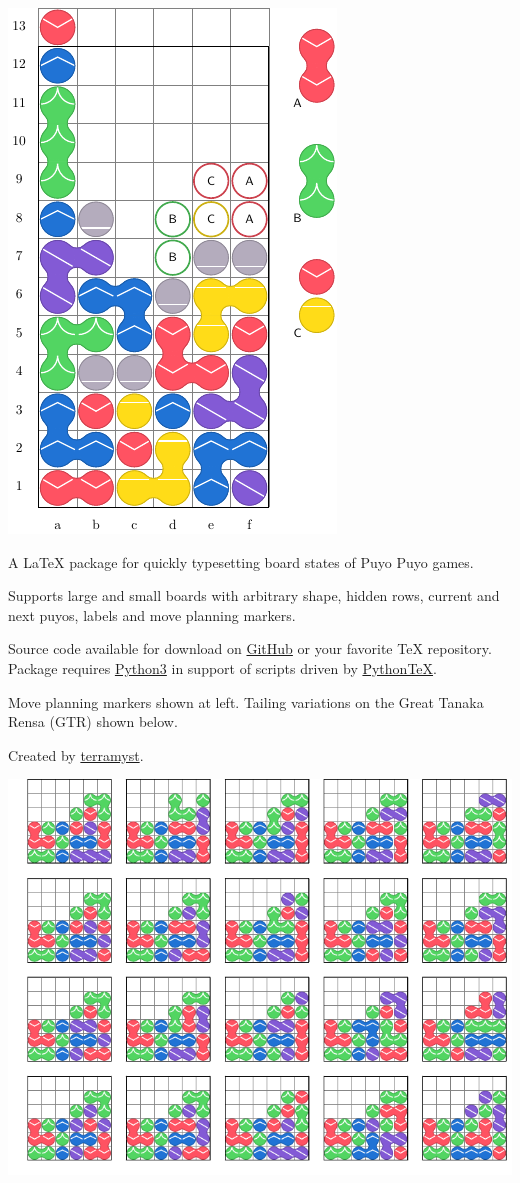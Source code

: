 \documentclass{article}
\makeatletter
\newcommand{\latex}{\LaTeX\xspace}
\newcommand{\tex}{\TeX\xspace}
\newcommand{\parline}{\vspace{\baselineskip}}
\newcommand{\parlineskip}{\par \parline}
\newcommand{\link}[2]{\href{#1}{\color{darkbluepuyo}#2}}
\newcommand{\github}{\link{https://github.com/amosborne/puyotex}{GitHub}\xspace}
\newcommand{\python}{\link{https://www.python.org/download/releases/3.0/}{Python3}\xspace}
\newcommand{\pythontex}{\link{https://ctan.org/pkg/pythontex?lang=en}{Python\tex}\xspace}
\newenvironment{halfpage}[1][]
	{\noindent\begin{minipage}{0.5\textwidth}\@ifmtarg{#1}{}{\begin{center}\Huge#1\end{center}}}
	{\end{minipage}}
\makeatother
\begin{document}
\begin{halfpage}
	\includegraphics{subfigures/cover_big_board.pdf}
\end{halfpage}%
\begin{halfpage}[Puyo\tex]
	A \latex package for quickly typesetting board states of Puyo Puyo games.\parlineskip
	Supports large and small boards with arbitrary shape, hidden rows, current and next puyos, labels and move planning markers.\parlineskip
	Source code available for download on \github or your favorite \tex repository. Package requires \python in support of scripts driven by \pythontex.\parlineskip
	Move planning markers shown at left. Tailing variations on the Great Tanaka Rensa (GTR) shown below.\parlineskip
	Created by \link{https://twitter.com/terramyst1}{terramyst}.
\end{halfpage}

\parline
\noindent
\includegraphics{subfigures/cover_small_boards.pdf}
\end{document}
